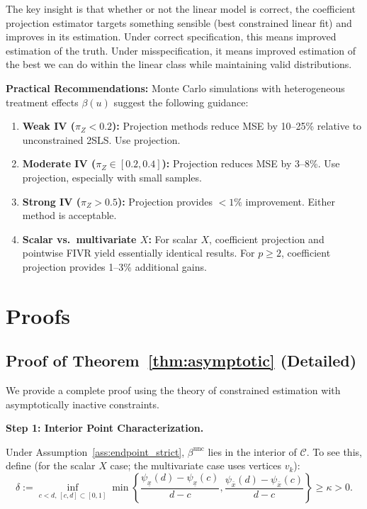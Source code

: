 \documentclass[12pt]{article}
\newcommand{\xbar}{\underline{x}}
\newcommand{\xbaru}{\bar{x}}
\begin{document}
The key insight is that whether or not the linear model is correct, the coefficient projection estimator targets something sensible (best constrained linear fit) and improves in its estimation. Under correct specification, this means improved estimation of the truth. Under misspecification, it means improved estimation of the best we can do within the linear class while maintaining valid distributions.

\textbf{Practical Recommendations:} Monte Carlo simulations with heterogeneous treatment effects $\beta(u)$ suggest the following guidance:
\begin{enumerate}
\item \textbf{Weak IV ($\pi_Z < 0.2$):} Projection methods reduce MSE by 10--25\% relative to unconstrained 2SLS. Use projection.
\item \textbf{Moderate IV ($\pi_Z \in [0.2, 0.4]$):} Projection reduces MSE by 3--8\%. Use projection, especially with small samples.
\item \textbf{Strong IV ($\pi_Z > 0.5$):} Projection provides $<1\%$ improvement. Either method is acceptable.
\item \textbf{Scalar vs.\ multivariate $X$:} For scalar $X$, coefficient projection and pointwise FIVR yield essentially identical results. For $p \geq 2$, coefficient projection provides 1--3\% additional gains.
\end{enumerate}

\appendix

\section{Proofs}

\subsection{Proof of Theorem~\ref{thm:asymptotic} (Detailed)}

We provide a complete proof using the theory of constrained estimation with asymptotically inactive constraints.

\textbf{Step 1: Interior Point Characterization.}

Under Assumption~\ref{ass:endpoint_strict}, $\beta^{\text{unc}}$ lies in the interior of $\mathcal{C}$. To see this, define (for the scalar $X$ case; the multivariate case uses vertices $v_k$):
\[
\delta := \inf_{c<d,\, [c,d] \subset [0,1]} \min\left\{ \frac{\psi_{\xbar}(d) - \psi_{\xbar}(c)}{d-c}, \frac{\psi_{\xbaru}(d) - \psi_{\xbaru}(c)}{d-c} \right\} \geq \kappa > 0.
\]
\end{document}

